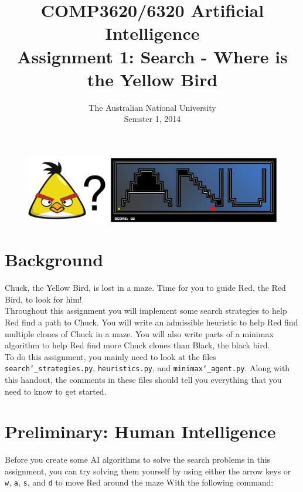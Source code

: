 \documentclass[12pt]{article}
\title{{\bf COMP3620/6320 Artificial Intelligence}\\
Assignment 1: Search - Where is the Yellow Bird}
\author{The Australian National University\\
Semster 1, 2014}
\date{}
\begin{document}
\vspace{-10mm}

\maketitle


\begin{figure}[h]
\centering
\includegraphics[width=130mm]{WhereIsChuck.pdf}
\end{figure}


\section{Background}

Chuck, the Yellow Bird, is lost in a maze. Time for you to guide Red, the Red Bird, to look for him!\\

Throughout this assignment you will implement some search strategies to help Red find a path to Chuck.
You will write an admissible heuristic to help Red find multiple clones of Chuck in a maze.
You will also write parts of a minimax algorithm to help Red find more Chuck clones than Black, the
black bird.\\

To do this assignment, you mainly need to look at the files \texttt{search\char`_strategies.py},
\texttt{heuristics.py}, and \texttt{minimax\char`_agent.py}. Along with this handout, the comments
in these files should tell you everything that you need to know to get started.


\section{Preliminary: Human Intelligence}

Before you create some AI algorithms to solve the search problems in this assignment,
you can try solving them yourself by using either the arrow keys or \texttt{w}, \texttt{a},
\texttt{s}, and \texttt{d} to move Red around the maze
With the following command:\\
\end{document}
